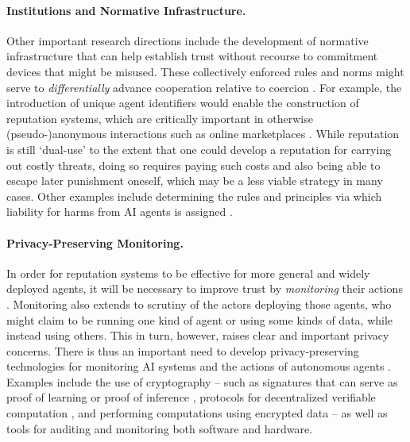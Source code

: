 \paragraph{Institutions and Normative Infrastructure.}
Other important research directions include the development of normative infrastructure that can help establish trust without recourse to commitment devices that might be misused.
These collectively enforced rules and norms might serve to \textit{differentially} advance cooperation relative to coercion \citep{Sandbrink2022}.
For example, the introduction of unique agent identifiers \citep{Chan2024} would enable the construction of reputation systems, which are critically important in otherwise (pseudo-)anonymous interactions such as online marketplaces \citep{Tadelis2016}.
While reputation is still `dual-use' to the extent that one could develop a reputation for carrying out costly threats, doing so requires paying such costs and also being able to escape later punishment oneself, which may be a less viable strategy in many cases.
Other examples include determining the rules and principles via which liability for harms from AI agents is assigned \citep[see also ]{ayres_law_2024, lima_could_2017, lior_ai_2019, Kolt2024, Chopra2011, Solum1992}.

\paragraph{Privacy-Preserving Monitoring.}
In order for reputation systems to be effective for more general and widely deployed agents, it will be necessary to improve trust by \textit{monitoring} their actions \citep{Chan2024a}.
Monitoring also extends to scrutiny of the actors deploying those agents, who might claim to be running one kind of agent or using some kinds of data, while instead using others.
This in turn, however, raises clear and important privacy concerns.
There is thus an important need to develop privacy-preserving technologies for monitoring AI systems and the actions of autonomous agents \citep{Shavit2023WhatDI,vegesna2023privacy}.
Examples include the use of cryptography -- such as signatures that can serve as proof of learning \citep{Jia2021} or proof of inference \citep{Ghodsi2017}, protocols for decentralized verifiable computation \citep{yao_protocols_1982,47976}, and performing computations using encrypted data \citep{Martins2017,Dowlin2016} -- as well as tools for auditing and monitoring both software and hardware.

